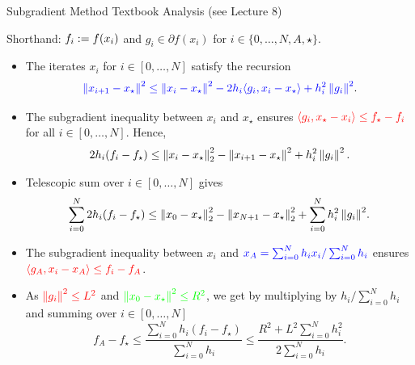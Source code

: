\documentclass[9pt]{beamer}
\begin{document}
\begin{frame}[label=textbook]{Subgradient Method Textbook Analysis (see Lecture 8)}

  Shorthand: $f_i := f(x_i)$ and $g_i \in \partial f(x_i)$ for $i \in \{0, \dots, N, A, \star\}$.

  \begin{itemize}
  \item<1-> The iterates $x_i$ for $i\in [0, \dots, N]$ satisfy the recursion
    \[
      {\color{blue} \left\| x_{i+1}-x_\star\right\|^2\leq \left\|x_i-x_\star\right\|^2 - 2 h_i \langle  g_i , x_i -x_\star \rangle + h_i^2 \left\|g_i\right\|^2} .
    \]
  \item<2-> The subgradient inequality between $x_i$ and $x_\star$ ensures ${\color{red} \langle  g_i, x_\star-x_i\rangle \leq f_\star-f_i}$ for all $i\in [0, \dots, N]$. Hence,
    \[
      2 h_i (f_i-f_\star) \leq \left\|x_i-x_\star\right\|^2_2 - \left\|x_{i+1}-x_\star\right\|^2 + h_i^2 \left\| g_i\right\|^2.
    \]
  \item<3-> Telescopic sum over $i\in [0, \dots, N]$ gives
    \[
      \sum_{i=0}^N 2 h_i (f_i-f_\star) \leq \left\|x_0-x_\star\right\|_2^2 - \left\|x_{N+1}-x_\star\right\|_2^2 + {\sum_{i=0}^N h_i^2 \left\| g_i\right\|^2}.
    \]
  \item<4-> The subgradient inequality between $x_i$ and ${\color{blue} x_A= \sum_{i=0}^N h_i x_i/\sum_{i=0}^N h_i}$ ensures ${\color{red} \langle g_A, x_i-x_A\rangle \leq f_i-f_A}$.
  \item<4-> As ${\color{red} \left\| g_i\right\|^2\leq L^2}$ and $\color{green}{\left\|x_0-x_\star\right\|^2\leq R^2}$, we get by multiplying by $h_i/\sum_{i=0}^N h_i$ and summing over $i\in [0,\dots, N]$
    \[
      f_A - f_\star\leq \frac{\sum_{i=0}^N h_i (f_i-f_\star)}{\sum_{i=0}^N h_i} \leq \frac{R^2+{L^2 \sum_{i=0}^N h_i^2}}{2 \sum_{i=0}^N h_i}.
    \]
  \end{itemize}

  
\end{frame}
\end{document}
